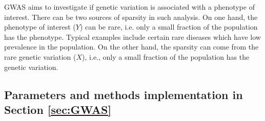 \documentclass[12pt]{article}
\theoremstyle{definition}
\begin{document}
GWAS aims to investigate if genetic variation is associated with a phenotype of interest. There can be two sources of sparsity in such analysis. On one hand, the phenotype of interest ($Y$) can be rare, i.e. only a small fraction of the population has the phenotype. Typical examples include certain rare diseases which have low prevalence in the population. On the other hand, the sparsity can come from the rare genetic variation ($X$), i.e., only a small fraction of the population has the genetic variation. 


\subsection{Parameters and methods implementation in Section \ref{sec:GWAS}}\label{sec:simulation_methods_GWAS}
\end{document}
